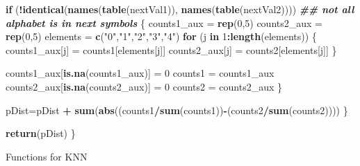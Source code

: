 \documentclass[
]{article}
\newenvironment{Shaded}{\begin{snugshade}}{\end{snugshade}}
\newcommand{\ControlFlowTok}[1]{\textcolor[rgb]{0.13,0.29,0.53}{\textbf{#1}}}
\newcommand{\DecValTok}[1]{\textcolor[rgb]{0.00,0.00,0.81}{#1}}
\newcommand{\DocumentationTok}[1]{\textcolor[rgb]{0.56,0.35,0.01}{\textbf{\textit{#1}}}}
\newcommand{\FunctionTok}[1]{\textcolor[rgb]{0.13,0.29,0.53}{\textbf{#1}}}
\newcommand{\NormalTok}[1]{#1}
\newcommand{\OtherTok}[1]{\textcolor[rgb]{0.56,0.35,0.01}{#1}}
\newcommand{\SpecialCharTok}[1]{\textcolor[rgb]{0.81,0.36,0.00}{\textbf{#1}}}
\newcommand{\StringTok}[1]{\textcolor[rgb]{0.31,0.60,0.02}{#1}}
\begin{document}
\begin{Shaded}
\begin{Highlighting}[]
      \ControlFlowTok{if}\NormalTok{ (}\SpecialCharTok{!}\FunctionTok{identical}\NormalTok{(}\FunctionTok{names}\NormalTok{(}\FunctionTok{table}\NormalTok{(nextVal1)), }\FunctionTok{names}\NormalTok{(}\FunctionTok{table}\NormalTok{(nextVal2)))) }\DocumentationTok{\#\# not all alphabet is in next symbols}
\NormalTok{      \{ }
\NormalTok{        counts1\_aux }\OtherTok{=} \FunctionTok{rep}\NormalTok{(}\DecValTok{0}\NormalTok{,}\DecValTok{5}\NormalTok{)}
\NormalTok{        counts2\_aux }\OtherTok{=} \FunctionTok{rep}\NormalTok{(}\DecValTok{0}\NormalTok{,}\DecValTok{5}\NormalTok{)}
\NormalTok{        elements }\OtherTok{=} \FunctionTok{c}\NormalTok{(}\StringTok{"0"}\NormalTok{,}\StringTok{"1"}\NormalTok{,}\StringTok{"2"}\NormalTok{,}\StringTok{"3"}\NormalTok{,}\StringTok{"4"}\NormalTok{)}
        \ControlFlowTok{for}\NormalTok{ (j }\ControlFlowTok{in} \DecValTok{1}\SpecialCharTok{:}\FunctionTok{length}\NormalTok{(elements))}
\NormalTok{        \{}
\NormalTok{          counts1\_aux[j]  }\OtherTok{=}\NormalTok{ counts1[elements[j]]}
\NormalTok{          counts2\_aux[j]  }\OtherTok{=}\NormalTok{ counts2[elements[j]]                }
\NormalTok{        \}}
        
\NormalTok{        counts1\_aux[}\FunctionTok{is.na}\NormalTok{(counts1\_aux)] }\OtherTok{=} \DecValTok{0}
\NormalTok{        counts1 }\OtherTok{=}\NormalTok{ counts1\_aux}
\NormalTok{        counts2\_aux[}\FunctionTok{is.na}\NormalTok{(counts2\_aux)] }\OtherTok{=} \DecValTok{0}
\NormalTok{        counts2 }\OtherTok{=}\NormalTok{ counts2\_aux}
\NormalTok{      \}}
      
\NormalTok{      pDist}\OtherTok{=}\NormalTok{pDist }\SpecialCharTok{+} \FunctionTok{sum}\NormalTok{(}\FunctionTok{abs}\NormalTok{((counts1}\SpecialCharTok{/}\FunctionTok{sum}\NormalTok{(counts1))}\SpecialCharTok{{-}}\NormalTok{(counts2}\SpecialCharTok{/}\FunctionTok{sum}\NormalTok{(counts2))))}
\NormalTok{    \}}
  
  \FunctionTok{return}\NormalTok{(pDist)}
\NormalTok{\}}
\end{Highlighting}
\end{Shaded}

Functions for KNN
\end{document}
